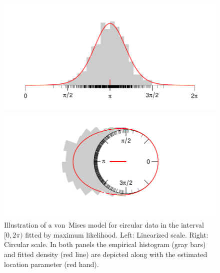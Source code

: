 \documentclass{statsoc}
\begin{document}
\begin{figure}[t]
  \begin{minipage}{.05\textwidth}
    \hfill
  \end{minipage}%
  \begin{minipage}{.45\textwidth}
    \vspace{-1em}
    \includegraphics[width=1.05\linewidth]{density_linear.pdf}
  \end{minipage}%
  \begin{minipage}{.45\textwidth}
    \includegraphics[width=1.2\linewidth]{density_circular.pdf}
  \end{minipage}
  \begin{minipage}{.05\textwidth}
    \hfill
  \end{minipage}%
  \caption{\label{fig:densities} Illustration of a von~Mises model for circular data in
    the interval $[0, 2\pi)$ fitted by maximum likelihood. Left: Linearized
    scale. Right: Circular scale. In both panels the empirical histogram (gray bars)
    and fitted density (red line) are depicted along with the estimated location
    parameter (red hand).}
\end{figure}
\end{document}
